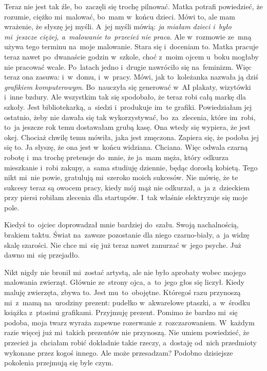 \documentclass[9pt, a5paper]{memoir}
\begin{document}
Teraz nie jest tak źle, bo~zaczęli się trochę pilnować. Matka potrafi powiedzieć, że rozumie, ciężko mi~malować, bo~mam w~końcu dzieci. Mówi to, ale mam wrażenie, że słyszę jej myśli. A~jej myśli mówią: \textit{ja miałam dzieci i~było mi~jeszcze ciężej, a~malowanie to~przecież nie praca}. Ale w~rozmowie ze~mną używa tego terminu na~moje malowanie. Stara się i~doceniam to. Matka pracuje teraz nawet po~dwanaście godzin w~szkole, choć z~moim ojcem u~boku mogłaby nie pracować wcale. Po~latach jedno i~drugie nawróciło się na~feminizm. Więc teraz ona zasuwa: i~w~domu, i~w~pracy. Mówi, jak to~koleżanka nazwała ją dziś \textit{grafikiem komputerowym}. Bo~nauczyła się generować w~AI plakaty, wizytówki i~inne bzdury. Ale wszystkim tak się spodobało, że teraz robi całą markę dla szkoły. Jest bibliotekarką, a~siedzi i~produkuje im~te grafiki. Powiedziałam jej ostatnio, żeby nie dawała się tak wykorzystywać, bo~za~zlecenia, które im~robi, to~ja jeszcze rok temu dostawałam grubą kasę. Ona wtedy się wypiera, że jest okej. Chociaż chwilę temu mówiła, jaka jest zmęczona. Zapiera się, że podoba jej się to. Ja słyszę, że ona jest w~końcu widziana. Chciana. Więc odwala czarną robotę i~ma trochę pretensje do~mnie, że ja~mam męża, który odkurza mieszkanie i~robi zakupy, a~sama studiuję dziennie, będąc dorosłą kobietą. Tego nikt mi~nie powie, gratulują mi~szeroko moich sukcesów. Nie mówię, że te sukcesy teraz są owocem pracy, kiedy mój mąż nie odkurzał, a~ja z~dzieckiem przy piersi robiłam zlecenia dla startupów. I~tak właśnie elektryzuje się moje pole.

Kiedyś to~ojciec doprowadzał mnie bardziej do~szału. Swoją nachalnością, brakiem taktu. Świat na~zawsze pozostanie dla niego czarno-biały, a~ja widzę skalę szarości. Nie chce mi~się już teraz nawet zanurzać w~jego psyche. Już dawno mi~się przejadło.

Nikt nigdy nie bronił mi~zostać artystą, ale nie było aprobaty wobec mojego malowania zwierząt. Głównie ze~strony ojca, a~to~jego głos się liczył. Kiedy maluję zwierzęta, zbywa to. Jest mu~to~obojętne. Któregoś razu przynoszą mi~z~mamą na~urodziny prezent: pudełko w~akwarelowe ptaszki, a~w~środku książka z~ptasimi grafikami. Przyjmuję prezent. Pomimo że bardzo mi~się podoba, moja twarz wyraża zapewne rozerwanie z~rozczarowaniem. W~każdym razie więcej już mi~takich prezentów nie przynoszą. Nie umiem powiedzieć, że przecież ja~chciałam robić dokładnie takie rzeczy, a~dostaję od~nich przedmioty wykonane przez kogoś innego. Ale może przesadzam? Podobno dzisiejsze pokolenia przejmują się byle czym.
\end{document}
